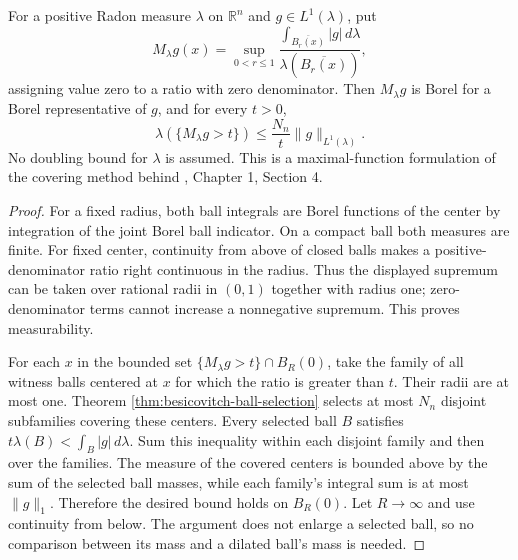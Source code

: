 \begin{proposition}\label{prop:radon-maximal-weak}
For a positive Radon measure $\lambda$ on $\mathbb R^n$ and $g\in L^1(\lambda)$, put
\[
 M_\lambda g(x)=\sup_{0<r\leq1}
   \frac{\int_{\overline{B_r(x)}}|g|\,d\lambda}
        {\lambda(\overline{B_r(x)})},
\]
assigning value zero to a ratio with zero denominator. Then $M_\lambda g$ is Borel for a Borel representative of $g$, and for every $t>0$,
\[
 \lambda(\{M_\lambda g>t\})\leq\frac{N_n}{t}\|g\|_{L^1(\lambda)}.
\]
No doubling bound for $\lambda$ is assumed. This is a maximal-function formulation of the covering method behind \cite{Sim18}, Chapter 1, Section 4.
\end{proposition}
\begin{proof}
For a fixed radius, both ball integrals are Borel functions of the center by integration of the joint Borel ball indicator. On a compact ball both measures are finite. For fixed center, continuity from above of closed balls makes a positive-denominator ratio right continuous in the radius. Thus the displayed supremum can be taken over rational radii in $(0,1)$ together with radius one; zero-denominator terms cannot increase a nonnegative supremum. This proves measurability.

For each $x$ in the bounded set $\{M_\lambda g>t\}\cap B_R(0)$, take the family of all witness balls centered at $x$ for which the ratio is greater than $t$. Their radii are at most one. Theorem \ref{thm:besicovitch-ball-selection} selects at most $N_n$ disjoint subfamilies covering these centers. Every selected ball $B$ satisfies $t\lambda(B)<\int_B|g|\,d\lambda$. Sum this inequality within each disjoint family and then over the families. The measure of the covered centers is bounded above by the sum of the selected ball masses, while each family's integral sum is at most $\|g\|_1$. Therefore the desired bound holds on $B_R(0)$. Let $R\to\infty$ and use continuity from below. The argument does not enlarge a selected ball, so no comparison between its mass and a dilated ball's mass is needed.
\end{proof}

